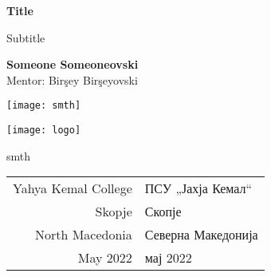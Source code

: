 \begin{titlepage}
	\begin{center}
    	\vspace*{1cm}
		
		\Huge
		\textbf{Title}
		
		\vspace{0.5cm}
		\LARGE
        Subtitle
		
		\vspace{1.5cm}
		
		\textbf{Someone Someoneovski}\\
		{Mentor: Birşey Birşeyovski}
		
		\vfill

		\texttt{[image: smth]}
		
		\vspace{2cm}
		
		\texttt{[image: logo]}
		
		\Large
		smth\\
		\begin{tabular}{ r | l }
            Yahya Kemal College & ПСУ „Јахја Кемал“\\
            Skopje & Скопје\\
            North Macedonia & Северна Македонија\\
            May 2022 & мај 2022
        \end{tabular}
            
	\end{center}
\end{titlepage}

